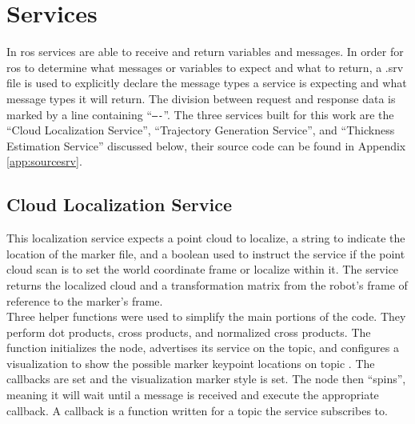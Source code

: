 \section{Services}
In \acrshort{ros} services are able to receive and return variables and messages. In order for \acrshort{ros} to determine what messages or variables to expect and what to return, a .srv file is used to explicitly declare the message types a service is expecting and what message types it will return. The division between request and response data is marked by a line containing ``\texttt{----}''. The three services built for this work are the ``Cloud Localization Service'', ``Trajectory Generation Service'', and ``Thickness Estimation Service'' discussed below, their source code can be found in Appendix \ref{app:sourcesrv}.\\
\subsection{Cloud Localization Service}
This localization service expects a point cloud to localize, a string to indicate the location of the marker file, and a boolean used to instruct the service if the point cloud scan is to set the world coordinate frame or localize within it. The service returns the localized cloud and a transformation matrix from the robot's frame of reference to the marker's frame.\\
%
  
Three helper functions were used to simplify the main portions of the code. They perform dot products, cross products, and normalized cross products. The  function initializes the node, advertises its service on the  topic, and configures a visualization to show the possible marker keypoint locations on topic . The  callbacks are set and the visualization marker style is set. The node then ``spins'', meaning it will wait until a message is received and execute the appropriate callback. A callback is a function written for a topic the service subscribes to.\\

